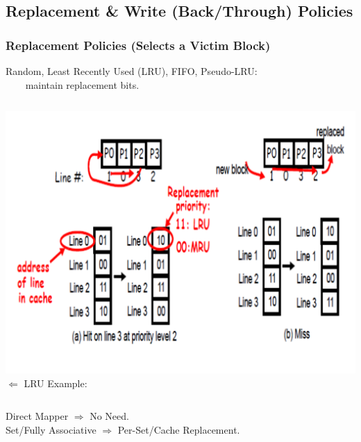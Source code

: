 \documentclass{beamer}
\newcommand{\emp}[1]{\textcolor{DikuRed}{ #1}}
\begin{document}
\subsection{Replacement \& Write (Back/Through) Policies}
\begin{frame}[fragile,t]
\frametitle{Replacement Policies (Selects a Victim Block)}

Random, Least Recently Used (LRU), FIFO, Pseudo-LRU:\\
    {\tt~~~~}maintain replacement bits.

\vspace{-2ex}
\begin{columns}
\hspace{-5ex}\includegraphics[width=50ex]{Figures/FigsMemH/LRU}\pause
{}
$\Leftarrow$ LRU Example:
\end{columns}
\vspace{-2ex}
\emp{Direct Mapper $\Rightarrow$ No Need.}\\
\emp{Set/Fully Associative $\Rightarrow$ Per-Set/Cache Replacement.}

\end{frame}
\end{document}
